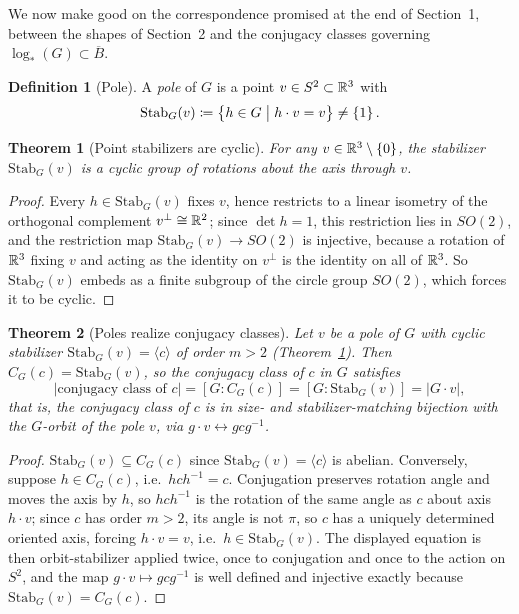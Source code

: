 \documentclass{amsart}
\theoremstyle{plain}
\newtheorem{theorem}{Theorem}
\theoremstyle{definition}
\newtheorem*{definition}{Definition}
\begin{document}
We now make good on the correspondence promised at the end of Section~1, between the shapes of Section~2 and the conjugacy classes governing $\log_*(G)\subset\overline{B}$.
\begin{definition}[Pole]
    A \emph{pole} of $G$ is a point $v\in S^2\subset\mathbb{R}^3$ with
    \begin{equation*}
        \mathrm{Stab}_G(v)\coloneqq\left\{h\in G\hspace{1mm}\big|\hspace{1mm} h\cdot v=v\right\}\neq\left\{1\right\}.
    \end{equation*}
\end{definition}
\begin{theorem}[Point stabilizers are cyclic]\label{thm:cyclic-stab}
    For any $v\in\mathbb{R}^3\setminus\left\{0\right\}$, the stabilizer $\mathrm{Stab}_G(v)$ is a cyclic group of rotations about the axis through $v$.
\end{theorem}
\begin{proof}
    Every $h\in\mathrm{Stab}_G(v)$ fixes $v$, hence restricts to a linear isometry of the orthogonal complement $v^\perp\cong\mathbb{R}^2$; since $\det h=1$, this restriction lies in $SO(2)$, and the restriction map $\mathrm{Stab}_G(v)\to SO(2)$ is injective, because a rotation of $\mathbb{R}^3$ fixing $v$ and acting as the identity on $v^\perp$ is the identity on all of $\mathbb{R}^3$. So $\mathrm{Stab}_G(v)$ embeds as a finite subgroup of the circle group $SO(2)$, which forces it to be cyclic.
\end{proof}
\begin{theorem}[Poles realize conjugacy classes]\label{thm:poles-conj}
    Let $v$ be a pole of $G$ with cyclic stabilizer $\mathrm{Stab}_G(v)=\langle c\rangle$ of order $m>2$ (Theorem~\ref{thm:cyclic-stab}). Then $C_G(c)=\mathrm{Stab}_G(v)$, so the conjugacy class of $c$ in $G$ satisfies
    \begin{equation}
        \left|\text{conjugacy class of }c\right| = \left[G:C_G(c)\right] = \left[G:\mathrm{Stab}_G(v)\right] = \left|G\cdot v\right|,
    \end{equation}
    that is, the conjugacy class of $c$ is in size- and stabilizer-matching bijection with the $G$-orbit of the pole $v$, via $g\cdot v\leftrightarrow gcg^{-1}$.
\end{theorem}
\begin{proof}
    $\mathrm{Stab}_G(v)\subseteq C_G(c)$ since $\mathrm{Stab}_G(v)=\langle c\rangle$ is abelian. Conversely, suppose $h\in C_G(c)$, i.e.\ $hch^{-1}=c$. Conjugation preserves rotation angle and moves the axis by $h$, so $hch^{-1}$ is the rotation of the same angle as $c$ about axis $h\cdot v$; since $c$ has order $m>2$, its angle is not $\pi$, so $c$ has a uniquely determined oriented axis, forcing $h\cdot v=v$, i.e.\ $h\in\mathrm{Stab}_G(v)$. The displayed equation is then orbit-stabilizer applied twice, once to conjugation and once to the action on $S^2$, and the map $g\cdot v\mapsto gcg^{-1}$ is well defined and injective exactly because $\mathrm{Stab}_G(v)=C_G(c)$.
\end{proof}
\end{document}
